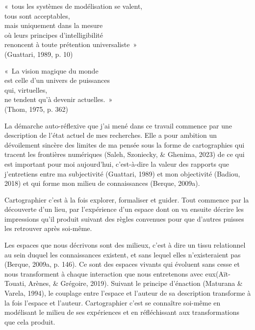 \documentclass[
  a4paper,
  DIV=11,
  numbers=noendperiod]{scrreprt}
\begin{document}
\label{exergue1}
«~tous les systèmes de modélisation se valent,\\
tous sont acceptables,\\
mais uniquement dans la mesure\\
où leurs principes d'intelligibilité\\
renoncent à toute prétention universaliste~»\\
(Guattari, 1989, p. 10)

\label{exergue2}
«~La vision magique du monde\\
est celle d'un univers de puissances\\
qui, virtuelles,\\
ne tendent qu'à devenir actuelles.~»\\
(Thom, 1975, p. 362)

La démarche auto-réflexive que j'ai mené dans ce travail commence par
une description de l'état actuel de mes recherches. Elle a pour ambition
un dévoilement sincère des limites de ma pensée sous la forme de
cartographies qui tracent les frontières numériques (Saleh, Szoniecky,
\& Ghenima, 2023) de ce qui est important pour moi aujourd'hui,
c'est-à-dire la valeur des rapports que j'entretiens entre ma
subjectivité (Guattari, 1989) et mon objectivité (Badiou, 2018) et qui
forme mon milieu de connaissances (Berque, 2009a).

Cartographier c'est à la fois explorer, formaliser et guider. Tout
commence par la découverte d'un lieu, par l'expérience d'un espace dont
on va ensuite décrire les impressions qu'il produit suivant des règles
convenues pour que d'autres puisses les retrouver après soi-même.

Les espaces que nous décrivons sont des milieux, c'est à dire un tissu
relationnel au sein duquel les connaissances existent, et sans lequel
elles n'existeraient pas (Berque, 2009a, p. 146). Ce sont des espaces
vivants qui évoluent sans cesse et nous transforment à chaque
interaction que nous entretenons avec eux(Aït-Touati, Arènes, \&
Grégoire, 2019). Suivant le principe d'énaction (Maturana \& Varela,
1994), le couplage entre l'espace et l'auteur de sa description
transforme à la fois l'espace et l'auteur. Cartographier c'est se
connaître soi-même en modélisant le milieu de ses expériences et en
réfléchissant aux transformations que cela produit.
\end{document}
